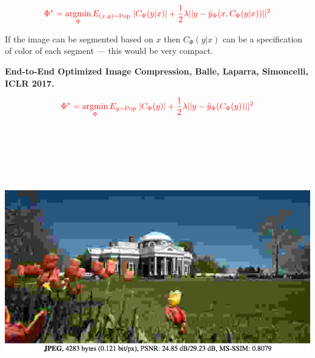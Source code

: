 {\vfill
$${\color{red} \Phi^* = \operatorname*{argmin}_\Phi E_{(x,y) \sim \mathrm{Pop}}\;|C_\Phi(y|x)| + \frac{1}{2}\lambda ||y - \hat{y}_\Phi(x,C_\Phi(y|x))||^2}$$

\vfill
If the image can be segmented based on $x$ then $C_\Phi(y|x)$ can be a specification of color of each segment --- this would be very compact.


{\bf End-to-End Optimized Image Compression, Balle, Laparra, Simoncelli, ICLR 2017.}

$${\color{red} \Phi^* = \operatorname*{argmin}_\Phi E_{y \sim \mathrm{Pop}}\;|C_\Phi(y)| + \frac{1}{2}\lambda ||y - \hat{y}_\Phi(C_\Phi(y))||^2}$$


\bigskip
\centerline{\includegraphics[height=5in]{../images/RateDist2}}


}
